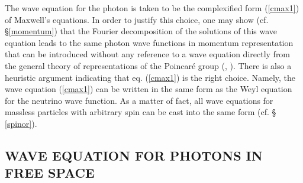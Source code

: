 \documentclass{article}
\begin{document}
The wave equation for the photon is taken to be the complexified form
(\ref{cmax1}) of Maxwell's equations. In order to justify this choice, one
may show (cf. \S \ref{momentum}) that the Fourier decomposition of the
solutions of this wave equation leads to the same photon wave functions in
momentum representation that can be introduced without any reference to a
wave equation directly from the general theory of representations of the Poincar\'e
group (\cite{BW_48}, \cite{LM_62}). There is also a heuristic argument
indicating that eq. (\ref{cmax1}) is the right choice. Namely, the wave
equation (\ref{cmax1}) can be written in the same form as the Weyl equation
for the neutrino wave function. As a matter of fact, all wave equations for
massless particles with arbitrary spin can be cast into the same form (cf. \S
\ref{spinor}).

\subsection[WAVE EQUATION IN FREE SPACE]{WAVE EQUATION FOR PHOTONS IN FREE
SPACE}
\end{document}
